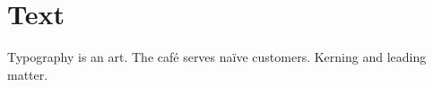 \documentclass{article}
\begin{document}
\section{Text}
Typography is an art. The café serves naïve
customers. Kerning and leading matter.
\printindex
\end{document}
